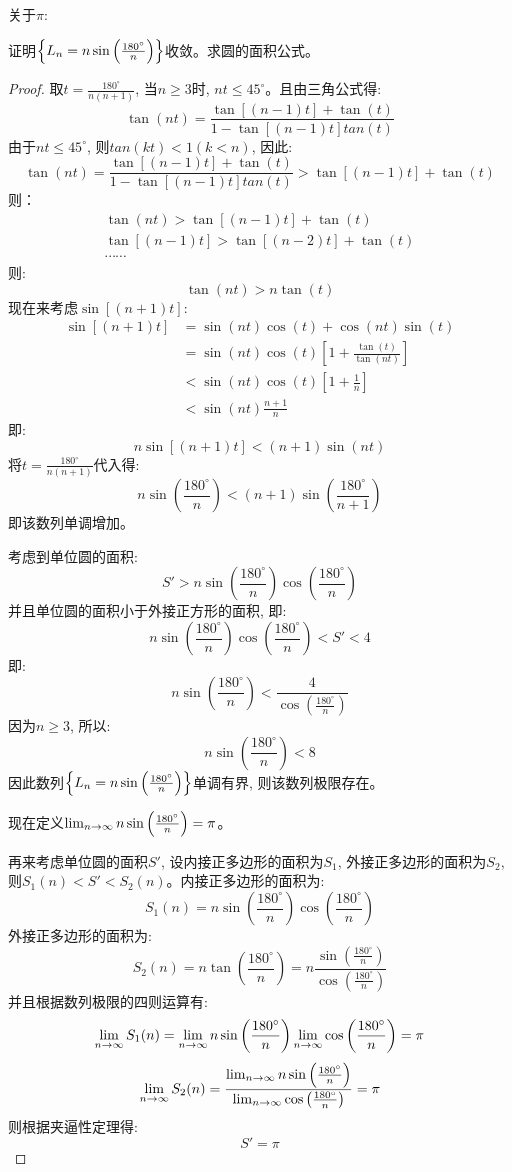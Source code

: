 关于$\pi$:
\begin{proposition}
    证明$\left\{ L_n = n\sin \left ( \frac{180^\circ}{n} \right )\right\}$收敛。求圆的面积公式。
\end{proposition}
\begin{proof}
取$t = \frac{180^\circ}{n(n+1)}$, 当$n \ge 3$时, $nt \le 45^\circ$。且由三角公式得: 
\[ \tan (nt) = \frac{\tan[(n-1)t] + \tan(t)}{1 - \tan[(n-1)t]tan(t)} \]
由于$nt \le 45^\circ$, 则$tan(kt) < 1(k < n)$, 因此: 
\[ \tan (nt) = \frac{\tan[(n-1)t] + \tan(t)}{1 - \tan[(n-1)t]tan(t)} > \tan[(n-1)t] + \tan(t)\]
则：
\begin{gather*}
    \tan(nt) > \tan[(n-1)t] + \tan(t) \\ 
    \tan[(n-1)t] > \tan[(n-2)t] + \tan(t) \\
    \cdots \cdots
\end{gather*}
则: 
\[ \tan(nt) > n\tan(t)\]
现在来考虑$\sin[(n+1)t]$: 
\[
\begin{split}
    \sin[(n+1)t] &= \sin(nt)\cos(t) + \cos(nt)\sin(t) \\
                &= \sin(nt)\cos(t)\left[ 1 + \frac{\tan(t)}{\tan(nt)}\right] \\
                &< \sin(nt)\cos(t)\left[ 1 + \frac{1}{n} \right] \\
                & < \sin(nt)\frac{n+1}{n}
\end{split}
\]
即: 
\[ n\sin[(n+1)t] < (n+1)\sin(nt) \]
将$t = \frac{180^\circ}{n(n+1)}$代入得: 
\[ n\sin\left( \frac{180^\circ}{n}\right) < (n + 1)\sin\left( \frac{180^\circ}{n+1} \right)\]
即该数列单调增加。

考虑到单位圆的面积: 
\[ S' > n \sin\left( \frac{180^\circ}{n}\right) \cos\left( \frac{180^\circ}{n}\right) \]
并且单位圆的面积小于外接正方形的面积, 即: 
\[ n \sin\left( \frac{180^\circ}{n}\right) \cos\left( \frac{180^\circ}{n}\right) < S' < 4 \]
即: 
\[ n\sin\left( \frac{180^\circ}{n}\right) < \frac{4}{\cos\left( \frac{180^\circ}{n}\right)}\]
因为$n \ge 3$, 所以: 
\[ n\sin\left( \frac{180^\circ}{n}\right) < 8\]
因此数列$\left\{ L_n = n\sin \left ( \frac{180^\circ}{n} \right )\right\}$单调有界, 则该数列极限存在。

现在定义$\lim_{n \to \infty } n\sin \left ( \frac{180^\circ}{n} \right ) = \pi$。

再来考虑单位圆的面积$S'$, 设内接正多边形的面积为$S_1$, 外接正多边形的面积为$S_2$, 则$S_1(n) < S' < S_2(n)$。内接正多边形的面积为:
\[ S_1(n) = n \sin\left( \frac{180^\circ}{n}\right) \cos\left( \frac{180^\circ}{n}\right)\]
外接正多边形的面积为: 
\[ S_2(n) = n \tan\left( \frac{180^\circ}{n}\right)  = n \frac{\sin\left( \frac{180^\circ}{n}\right)}{\cos\left( \frac{180^\circ}{n}\right)} \]
并且根据数列极限的四则运算有:
\[ \lim_{n \to \infty } S_1(n) = \lim_{n \to \infty } n \sin\left( \frac{180^\circ}{n}\right) \lim_{n \to \infty } \cos\left( \frac{180^\circ}{n}\right) = \pi\]
\[ \lim_{n \to \infty } S_2(n) = \frac{\lim_{n \to \infty } n\sin\left( \frac{180^\circ}{n}\right)}{\lim_{n \to \infty } \cos\left( \frac{180^\circ}{n}\right)} = \pi\]
则根据夹逼性定理得:
\[ S' = \pi \]


\end{proof}
